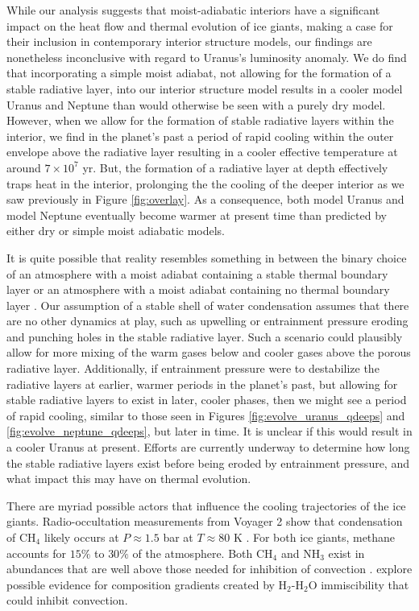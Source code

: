 \documentclass[11pt]{ucscthesisbs}
\begin{document}
While our analysis suggests that moist-adiabatic interiors have a significant impact on the heat flow and thermal evolution of ice giants, making a case for their inclusion in contemporary interior structure models, our findings are nonetheless inconclusive with regard to Uranus's luminosity anomaly. We do find that incorporating a simple moist adiabat, not allowing for the formation of a stable radiative layer, into our interior structure model results in a cooler model Uranus and Neptune than would otherwise be seen with a purely dry model. However, when we allow for the formation of stable radiative layers within the interior, we find in the planet's past a period of rapid cooling within the outer envelope above the radiative layer resulting in a cooler effective temperature at around $7 \times 10^7$ yr. But, the formation of a radiative layer at depth effectively traps heat in the interior, prolonging the the cooling of the deeper interior as we saw previously in Figure \ref{fig:overlay}. As a consequence, both model Uranus and model Neptune eventually become warmer at present time than predicted by either dry or simple moist adiabatic models. 

It is quite possible that reality resembles something in between the binary choice of an atmosphere with a moist adiabat containing a stable thermal boundary layer or an atmosphere with a moist adiabat containing no thermal boundary layer \citep{guillot_2019}. Our assumption of a stable shell of water condensation assumes that there are no other dynamics at play, such as upwelling or entrainment pressure \citep{friedson_2017,2019arXiv190802092G} eroding and punching holes in the stable radiative layer. Such a scenario could plausibly allow for more mixing of the warm gases below and cooler gases above the porous radiative layer. Additionally, if entrainment pressure were to destabilize the radiative layers at earlier, warmer periods in the planet's past, but allowing for stable radiative layers to exist in later, cooler phases, then we might see a period of rapid cooling, similar to those seen in Figures \ref{fig:evolve_uranus_qdeeps} and \ref{fig:evolve_neptune_qdeeps}, but later in time. It is unclear if this would result in a cooler Uranus at present. Efforts are currently underway to determine how long the stable radiative layers exist before being eroded by entrainment pressure, and what impact this may have on thermal evolution.

There are myriad possible actors that influence the cooling trajectories of the ice giants. Radio-occultation measurements from Voyager 2 show that condensation of CH$_{4}$ likely occurs at $ P \approx  1.5$ bar at $T \approx 80$ K \citep{1992AJ....103..967L}. For both ice giants, methane accounts for $15\%$ to $30 \%$ of the atmosphere. Both CH$_{4}$ and NH$_{3}$ exist in abundances that are well above those needed for inhibition of convection \citep{2019arXiv190802092G}. \citep{2020arXiv201204166B} explore possible evidence for composition gradients created by H$_{2}$-H$_{2}$O immiscibility that could inhibit convection. 
\end{document}
